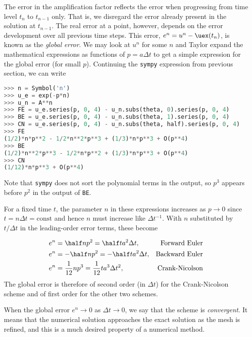 \documentclass[graybox,sectrefs,envcountresetchap,open=right,final]{svmonodo}
\newenvironment{notice_mdfboxadmon}[1][]{
\begin{notice_mdfboxmdframed}[frametitle=#1]
}
{
\end{notice_mdfboxmdframed}
}
\begin{document}

The error in the amplification factor reflects the error when
progressing from time level $t_n$ to $t_{n-1}$ only. That is,
we disregard the error already present in the solution at $t_{n-1}$.
The real error at a point, however, depends on the error development
over all previous time steps. This error,
$e^n = u^n-\uex(t_n)$, is known as the \emph{global error}. We
may look at $u^n$ for some $n$ and Taylor expand the
mathematical expressions as functions of $p=a\Delta t$ to get a simple
expression for the global error (for small $p$). Continuing the
\texttt{sympy} expression from previous section, we can write

\begin{lstlisting}[language=Python,style=blue1_bluegreen]
>>> n = Symbol('n')
>>> u_e = exp(-p*n)
>>> u_n = A**n
>>> FE = u_e.series(p, 0, 4) - u_n.subs(theta, 0).series(p, 0, 4)
>>> BE = u_e.series(p, 0, 4) - u_n.subs(theta, 1).series(p, 0, 4)
>>> CN = u_e.series(p, 0, 4) - u_n.subs(theta, half).series(p, 0, 4)
>>> FE
(1/2)*n*p**2 - 1/2*n**2*p**3 + (1/3)*n*p**3 + O(p**4)
>>> BE
(1/2)*n**2*p**3 - 1/2*n*p**2 + (1/3)*n*p**3 + O(p**4)
>>> CN
(1/12)*n*p**3 + O(p**4)
\end{lstlisting}
Note that \texttt{sympy} does not sort the polynomial terms in the output,
so $p^3$ appears before $p^2$ in the output of \texttt{BE}.

For a fixed time $t$, the parameter $n$ in these expressions increases
as $p\rightarrow 0$ since $t=n\Delta t =\mbox{const}$ and hence
$n$ must increase like $\Delta t^{-1}$. With $n$ substituted by
$t/\Delta t$ in
the leading-order error terms, these become

\begin{align}
e^n &= \half n p^2 = {\half}ta^2\Delta t, &\hbox{Forward Euler}
\label{decay:analysis:gobal:error:FE}\\ 
e^n &= -\half n p^2 = -{\half}ta^2\Delta t, &\hbox{Backward Euler}
\label{decay:analysis:gobal:error:BE}\\ 
e^n &= \frac{1}{12}np^3 = \frac{1}{12}ta^3\Delta t^2, &\hbox{Crank-Nicolson}
\label{decay:analysis:gobal:error:CN}
\end{align}
The global error is therefore of
second order (in $\Delta t$) for the Crank-Nicolson scheme and of
first order for the other two schemes.


\begin{notice_mdfboxadmon}[Convergence]
When the global error $e^n\rightarrow 0$ as $\Delta t\rightarrow 0$,
we say that the scheme is \emph{convergent}. It means that the numerical
solution approaches the exact solution as the mesh is refined, and
this is a much desired property of a numerical method.
\end{notice_mdfboxadmon}
\end{document}
